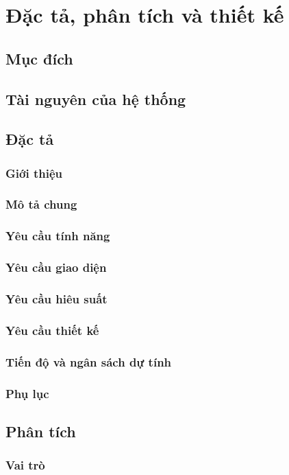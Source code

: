 \chapter{Đặc tả, phân tích và thiết kế}
\section*{Mục đích}
\section*{Tài nguyên của hệ thống}
\section{Đặc tả}
\subsection{Giới thiệu}
\subsection{Mô tả chung}


\subsection{Yêu cầu tính năng}
\subsection{Yêu cầu giao diện}
\subsection{Yêu cầu hiêu suất}
\subsection{Yêu cầu thiết kế}
\subsection{Tiến độ và ngân sách dự tính}
\subsection{Phụ lục}
\section{Phân tích}
\subsection{Vai trò}
